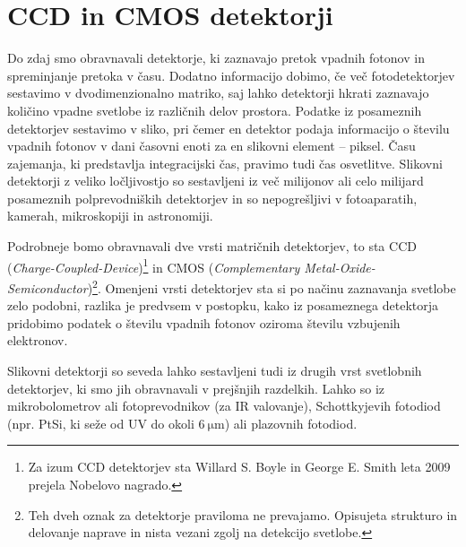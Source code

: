 \section{CCD in CMOS detektorji}
Do zdaj smo obravnavali detektorje, 
ki zaznavajo pretok vpadnih fotonov in spreminjanje
pretoka v času. Dodatno informacijo dobimo, če več fotodetektorjev sestavimo v 
dvodimenzionalno matriko, saj lahko detektorji hkrati zaznavajo količino vpadne svetlobe 
iz različnih delov prostora. Podatke iz posameznih detektorjev sestavimo v sliko, pri čemer 
en detektor podaja informacijo o številu vpadnih fotonov 
v dani časovni enoti za en slikovni element -- piksel. Času zajemanja, ki
predstavlja integracijski čas, pravimo tudi čas osvetlitve.  
Slikovni detektorji z veliko ločljivostjo so sestavljeni iz 
več milijonov ali celo milijard posameznih polprevodniških detektorjev in so 
nepogrešljivi v fotoaparatih, kamerah, mikroskopiji in astronomiji.

Podrobneje bomo obravnavali dve vrsti matričnih detektorjev, to sta CCD 
({\it Charge-Coupled-Device})\footnote{Za izum CCD detektorjev sta Willard 
S. Boyle in George E. Smith  leta 2009 prejela Nobelovo nagrado.} 
in CMOS ({\it Complementary Metal-Oxide-Semiconductor})\footnote{Teh 
dveh oznak za detektorje praviloma ne prevajamo. Opisujeta 
strukturo in delovanje naprave in nista vezani zgolj na detekcijo svetlobe.}. Omenjeni vrsti
detektorjev sta si po načinu zaznavanja svetlobe zelo podobni, razlika
je predvsem v postopku, kako iz posameznega detektorja pridobimo podatek o številu 
vpadnih fotonov oziroma številu vzbujenih elektronov.

\begin{remark}
Slikovni detektorji so seveda lahko sestavljeni tudi iz drugih vrst svetlobnih detektorjev, 
ki smo jih obravnavali v prejšnjih razdelkih. Lahko so iz mikrobolometrov
ali fotoprevodnikov (za IR valovanje),
Schottkyjevih fotodiod (npr. PtSi, ki seže od UV do
okoli $6~\si{\micro\meter}$) ali plazovnih fotodiod.
\end{remark}

